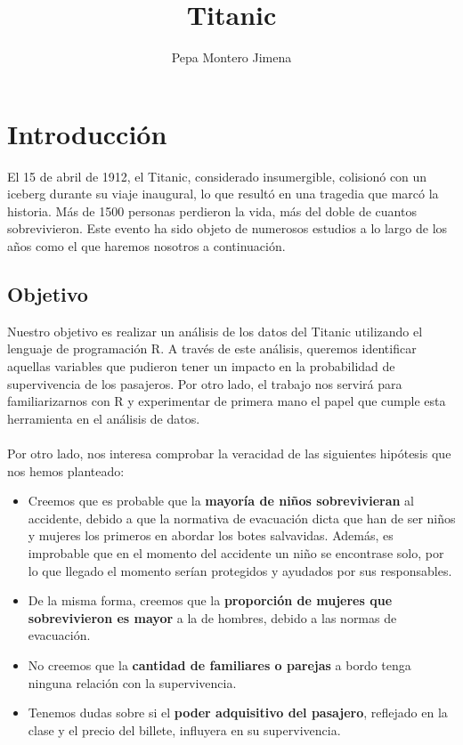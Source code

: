 \documentclass{article}
\title{Titanic}
\author{Pepa Montero Jimena}
\date{}
\begin{document}
\maketitle

\section{Introducción}

El 15 de abril de 1912, el Titanic, considerado insumergible, colisionó con un iceberg durante su viaje inaugural, lo que resultó en una tragedia que marcó la historia. Más de 1500 personas perdieron la vida, más del doble de cuantos sobrevivieron. Este evento ha sido objeto de numerosos estudios a lo largo de los años como el que haremos nosotros a continuación.

\subsection{Objetivo}
Nuestro objetivo es realizar un análisis de los datos del Titanic utilizando el lenguaje de programación R. A través de este análisis, queremos identificar aquellas variables que pudieron tener un impacto en la probabilidad de supervivencia de los pasajeros. Por otro lado, el trabajo nos servirá para familiarizarnos con R y experimentar de primera mano el papel que cumple esta herramienta en el análisis de datos.\\\\
Por otro lado, nos interesa comprobar la veracidad de las siguientes hipótesis que nos hemos planteado:
\begin{itemize}
    \item Creemos que es probable que la \textbf{mayoría de niños sobrevivieran} al accidente, debido a que la normativa de evacuación dicta que han de ser niños y mujeres los primeros en abordar los botes salvavidas. Además, es improbable que en el momento del accidente un niño se encontrase solo, por lo que llegado el momento serían protegidos y ayudados por sus responsables.
    \item De la misma forma, creemos que la \textbf{proporción de mujeres que sobrevivieron es mayor} a la de hombres, debido a las normas de evacuación.
    \item No creemos que la \textbf{cantidad de familiares o parejas} a bordo tenga ninguna relación con la supervivencia.
    \item Tenemos dudas sobre si el \textbf{poder adquisitivo del pasajero}, reflejado en la clase y el precio del billete, influyera en su supervivencia.
\end{itemize}
\end{document}
